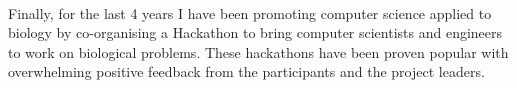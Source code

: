 \paragraph{}Finally, for the last 4 years I have been promoting computer science applied to biology by co-organising a Hackathon to bring computer scientists and engineers to work on biological problems.
These hackathons have been proven popular with overwhelming positive feedback from the participants and the project leaders.
